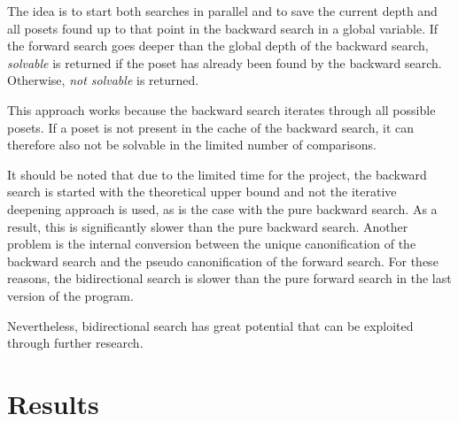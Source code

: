 \documentclass[10pt,journal,compsoc]{IEEEtran}
\newtheorem{lemma}{Lemma}
\begin{document}
The idea is to start both searches in parallel and to save the current depth and all posets found up to that point in the backward search in a global variable.
If the forward search goes deeper than the global depth of the backward search, \textit{solvable} is returned if the poset has already been found by the backward search.
Otherwise, \textit{not solvable} is returned.

This approach works because the backward search iterates through all possible posets.
If a poset is not present in the cache of the backward search, it can therefore also not be solvable in the limited number of comparisons.

It should be noted that due to the limited time for the project, the backward search is started with the theoretical upper bound and not the iterative deepening approach is used, as is the case with the pure backward search.
As a result, this is significantly slower than the pure backward search.
Another problem is the internal conversion between the unique canonification of the backward search and the pseudo canonification of the forward search.
For these reasons, the bidirectional search is slower than the pure forward search in the last version of the program.

Nevertheless, bidirectional search has great potential that can be exploited through further research.




\section{Results}
\end{document}
